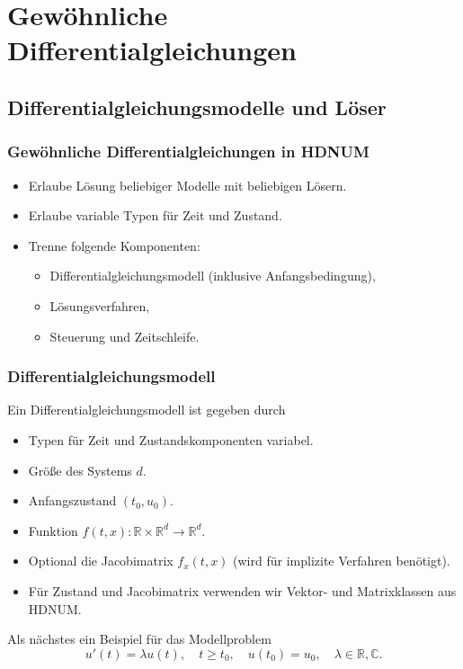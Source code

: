 \section{Gewöhnliche Differentialgleichungen}


\subsection{Differentialgleichungsmodelle und Löser}

\begin{frame}[fragile]
\frametitle{Gewöhnliche Differentialgleichungen in HDNUM}
\begin{itemize}
\item Erlaube Lösung beliebiger Modelle mit beliebigen Lösern.
\item Erlaube variable Typen für Zeit und Zustand.
\item Trenne folgende Komponenten:
\begin{itemize}
\item Differentialgleichungsmodell (inklusive Anfangsbedingung),
\item Lösungsverfahren,
\item Steuerung und Zeitschleife.
\end{itemize}
\end{itemize}
\end{frame}

\begin{frame}[fragile]
\frametitle{Differentialgleichungsmodell}
Ein Differentialgleichungsmodell ist gegeben durch
\begin{itemize}
\item Typen für Zeit und Zustandskomponenten variabel.
\item Größe des Systems $d$.
\item Anfangszustand $(t_0,u_0)$.
\item Funktion $f(t,x) : \mathbb{R}\times\mathbb{R}^d \to \mathbb{R}^d$.
\item Optional die Jacobimatrix $f_x(t,x)$ (wird für implizite Verfahren benötigt).
\item Für Zustand und Jacobimatrix verwenden wir Vektor- und Matrixklassen aus HDNUM.
\end{itemize}
Als nächstes ein Beispiel für das Modellproblem
\begin{equation*}
u'(t) = \lambda u(t), \quad t\geq t_0, \quad u(t_0)=u_0, \quad \lambda\in\mathbb{R}, \mathbb{C}.
\end{equation*}
\end{frame}


